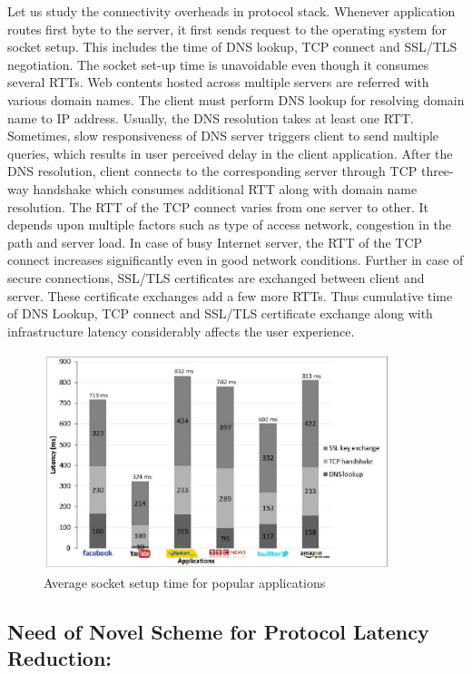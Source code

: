 \begin{multicols}{2}
Let us study the connectivity overheads in protocol stack. Whenever application routes first byte to the server, it first sends request to the operating system for socket setup. This includes the time of DNS lookup, TCP connect and SSL/TLS negotiation. The socket set-up time is unavoidable even though it consumes several RTTs. Web contents hosted across multiple servers are referred with various domain names. The client must perform DNS lookup for resolving domain name to IP address. Usually, the DNS resolution takes at least one RTT. Sometimes, slow responsiveness of DNS server triggers client to send multiple queries, which results in user perceived delay in the client application. After the DNS resolution, client connects to the corresponding server through TCP three-way handshake which consumes additional RTT along with domain name resolution. The RTT of the TCP connect varies from one server to other. It depends upon multiple factors such as type of access network, congestion in the path and server load. In case of busy Internet server, the RTT of the TCP connect increases significantly even in good network conditions. Further in case of secure connections, SSL/TLS certificates are exchanged between client and server. These certificate exchanges add a few more RTTs. Thus cumulative time of DNS Lookup, TCP connect and SSL/TLS certificate exchange along with infrastructure latency considerably affects the user experience.

\begin{figure}[H]
\centering
\includegraphics[scale=0.8]{src/Figures/chap1/chap1-fig05.jpg}
\caption{Average socket setup time for popular applications}\label{chap1-fig05}
\end{figure}

\subsection{Need of Novel Scheme for Protocol Latency Reduction:}


\end{multicols}
